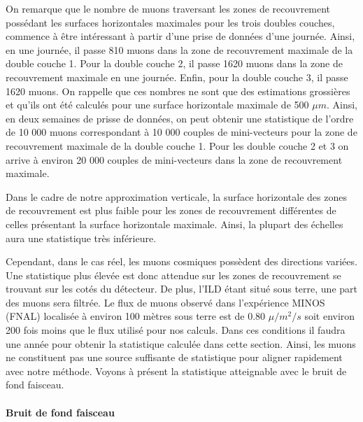  \medskip
 
 On remarque que le nombre de muons traversant les zones de recouvrement poss\'edant les surfaces horizontales maximales pour les trois doubles couches, commence \`a \^etre int\'eressant \`a partir d'une prise de donn\'ees d'une journ\'ee. Ainsi, en une journ\'ee, il passe 810 muons dans la zone de recouvrement maximale de la double couche 1. Pour la double couche 2, il passe 1620 muons dans la zone de recouvrement maximale en une journ\'ee. Enfin, pour la double couche 3, il passe 1620 muons. On rappelle que ces nombres ne sont que des estimations grossi\`eres et qu'ils ont \'et\'e calcul\'es pour une surface horizontale maximale de 500 $\mu m$. Ainsi, en deux semaines de prisse de donn\'ees, on peut obtenir une statistique de l'ordre de 10 000 muons correspondant \`a 10 000 couples de mini-vecteurs pour la zone de recouvrement maximale de la double couche 1. Pour les double couche 2 et 3 on arrive \`a  environ 20 000 couples de mini-vecteurs dans la zone de recouvrement maximale. 
 
 \medskip
 
 Dans le cadre de notre approximation verticale, la surface horizontale des zones de recouvrement est plus faible pour les zones de recouvrement diff\'erentes de celles pr\'esentant la surface horizontale maximale. Ainsi, la plupart des \'echelles aura une statistique tr\`es inf\'erieure.
 
 \medskip
 
 Cependant, dans le cas r\'eel, les muons cosmiques poss\`edent des directions vari\'ees. Une statistique plus \'elev\'ee est donc attendue sur les zones de recouvrement se trouvant sur les cot\'es du d\'etecteur. De plus, l'ILD \'etant situ\'e sous terre, une part des muons sera filtr\'ee. Le flux de muons observ\'e dans l'exp\'erience MINOS (FNAL) localis\'ee \`a environ 100 m\`etres sous terre est de 0.80 $\mu/m^2/s$ \cite{Garrison:2014nla} soit environ 200 fois moins que le flux utilis\'e pour nos calculs. Dans ces conditions il faudra une ann\'ee pour obtenir la statistique calcul\'ee dans cette section. Ainsi, les muons ne constituent pas une source suffisante de statistique pour aligner rapidement avec notre m\'ethode. Voyons \`a pr\'esent la statistique atteignable avec le bruit de fond faisceau.

  \paragraph{Bruit de fond faisceau}

